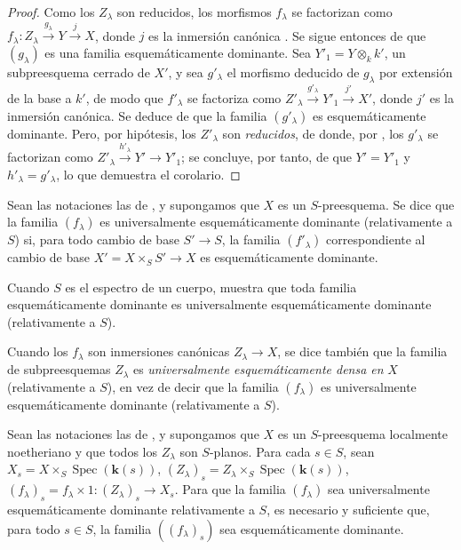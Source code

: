 \begin{proof}
Como los $Z_\lambda$ son reducidos, los morfismos $f_\lambda$ se factorizan como $f_\lambda:Z_\lambda\xrightarrow{g_\lambda}Y\xrightarrow{j}X$, donde $j$ es la inmersión canónica .
Se sigue entonces de  que $(g_\lambda)$ es una familia esquemáticamente dominante.
Sea $Y'_1=Y\otimes_k k'$, un subpreesquema cerrado de $X'$, y sea $g'_\lambda$ el morfismo deducido de $g_\lambda$ por extensión de la base a $k'$, de modo que $f'_\lambda$ se factoriza como $Z'_\lambda\xrightarrow{g'_\lambda}Y'_1\xrightarrow{j'}X'$, donde $j'$ es la inmersión canónica.
Se deduce de  que la familia $(g'_\lambda)$ es esquemáticamente dominante.
Pero, por hipótesis, los $Z'_\lambda$ son \emph{reducidos}, de donde, por , los $g'_\lambda$ se factorizan como $Z'_\lambda\xrightarrow{h'_\lambda}Y'\to Y'_1$; se concluye, por tanto, de  que $Y'=Y'_1$ y $h'_\lambda=g'_\lambda$, lo que demuestra el corolario.
\end{proof}

\begin{definition}[11.10.8]
\label{IV.11.10.8}
Sean las notaciones las de , y supongamos que $X$ es un $S$-preesquema.
Se dice que la familia $(f_\lambda)$ es universalmente esquemáticamente dominante (relativamente a $S$) si, para todo cambio de base $S'\to S$, la familia $(f'_\lambda)$ correspondiente al cambio de base $X'=X\times_SS'\to X$ es esquemáticamente dominante.
\end{definition}

Cuando $S$ es el espectro de un cuerpo,  muestra que toda familia esquemáticamente dominante es universalmente esquemáticamente dominante (relativamente a $S$).

Cuando los $f_\lambda$ son inmersiones canónicas $Z_\lambda\to X$, se dice también que la familia de subpreesquemas $Z_\lambda$ es \emph{universalmente esquemáticamente densa en} $X$ (relativamente a $S$), en vez de decir que la familia $(f_\lambda)$ es universalmente esquemáticamente dominante (relativamente a $S$).

\begin{theorem}[11.10.9]
\label{IV.11.10.9}
Sean las notaciones las de , y supongamos que $X$ es un $S$-preesquema localmente noetheriano y que todos los $Z_\lambda$ son $S$-planos.
Para cada $s\in S$, sean $X_s=X\times_S\operatorname{Spec}(\boldsymbol{k}(s))$, $(Z_\lambda)_s=Z_\lambda\times_S\operatorname{Spec}(\boldsymbol{k}(s))$, $(f_\lambda)_s=f_\lambda\times1:(Z_\lambda)_s\to X_s$.
Para que la familia $(f_\lambda)$ sea universalmente esquemáticamente dominante relativamente a $S$, es necesario y suficiente que, para todo $s\in S$, la familia $((f_\lambda)_s)$ sea esquemáticamente dominante.
\end{theorem}

